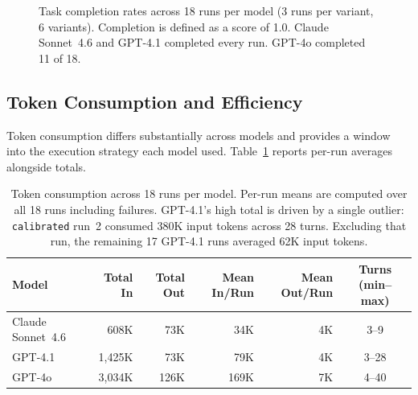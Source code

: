 \documentclass[11pt]{article}
\begin{document}
\begin{figure}[t]
\begin{center}
\end{center}
\caption{Task completion rates across 18 runs per model (3 runs per variant,
6 variants). Completion is defined as a score of 1.0. Claude Sonnet~4.6 and
GPT-4.1 completed every run. GPT-4o completed 11 of 18.}
\label{fig:completion}
\end{figure}

\subsection{Token Consumption and Efficiency}

Token consumption differs substantially across models and provides a window
into the execution strategy each model used. Table~\ref{tab:tokens} reports
per-run averages alongside totals.

\begin{table}[t]
\caption{Token consumption across 18 runs per model. Per-run means are
computed over all 18 runs including failures. GPT-4.1's high total is
driven by a single outlier: \texttt{calibrated} run~2 consumed 380K input
tokens across 28 turns. Excluding that run, the remaining 17 GPT-4.1 runs
averaged 62K input tokens.}
\label{tab:tokens}
\vskip 0.1in
\centering
\small
\begin{tabular}{@{}lrrrrc@{}}
\toprule
\textbf{Model} & \textbf{Total In} & \textbf{Total Out}
  & \textbf{Mean In/Run} & \textbf{Mean Out/Run}
  & \textbf{Turns (min--max)} \\
\midrule
Claude Sonnet~4.6 &  608K &  73K &  34K & 4K & 3--9 \\
GPT-4.1           & 1{,}425K & 73K &  79K & 4K & 3--28 \\
GPT-4o            & 3{,}034K & 126K & 169K & 7K & 4--40 \\
\bottomrule
\end{tabular}
\end{table}
\end{document}
